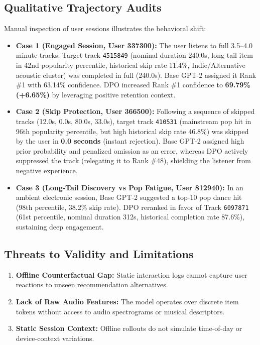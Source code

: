 \subsection{Qualitative Trajectory Audits}
Manual inspection of user sessions illustrates the behavioral shift:
\begin{itemize}
    \item \textbf{Case 1 (Engaged Session, User 337300):} The user listens to full 3.5--4.0 minute tracks. Target track \texttt{4515849} (nominal duration 240.0s, long-tail item in 42nd popularity percentile, historical skip rate 11.4\%, Indie/Alternative acoustic cluster) was completed in full (240.0s). Base GPT-2 assigned it Rank \#1 with 63.14\% confidence. DPO increased Rank \#1 confidence to \textbf{69.79\% (+6.65\%)} by leveraging positive retention context.
    \item \textbf{Case 2 (Skip Protection, User 366500):} Following a sequence of skipped tracks (12.0s, 0.0s, 80.0s, 33.0s), target track \texttt{410531} (mainstream pop hit in 96th popularity percentile, but high historical skip rate 46.8\%) was skipped by the user in \textbf{0.0 seconds} (instant rejection). Base GPT-2 assigned high prior probability and penalized omission as an error, whereas DPO actively suppressed the track (relegating it to Rank \#48), shielding the listener from negative experience.
    \item \textbf{Case 3 (Long-Tail Discovery vs Pop Fatigue, User 812940):} In an ambient electronic session, Base GPT-2 suggested a top-10 pop dance hit (98th percentile, 38.2\% skip rate). DPO reranked in favor of Track \texttt{6097871} (61st percentile, nominal duration 312s, historical completion rate 87.6\%), sustaining deep engagement.
\end{itemize}

\subsection{Threats to Validity and Limitations}
\begin{enumerate}
    \item \textbf{Offline Counterfactual Gap:} Static interaction logs cannot capture user reactions to unseen recommendation alternatives.
    \item \textbf{Lack of Raw Audio Features:} The model operates over discrete item tokens without access to audio spectrograms or musical descriptors.
    \item \textbf{Static Session Context:} Offline rollouts do not simulate time-of-day or device-context variations.
\end{enumerate}


